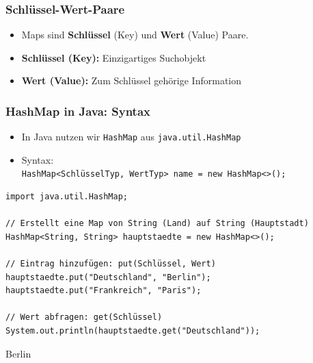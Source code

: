 \documentclass{../../presentation}
\begin{document}
\begin{frame}[fragile]
	\frametitle{Schlüssel-Wert-Paare}
	\begin{itemize}
		\item Maps sind \textbf{Schlüssel} (Key) und \textbf{Wert} (Value) Paare.
		\pause
		\item \textbf{Schlüssel (Key):} Einzigartiges Suchobjekt
		\pause
		\item \textbf{Wert (Value):} Zum Schlüssel gehörige Information
	\end{itemize}
	\pause
	\vspace{0.8em}
	\centering
\end{frame}

\begin{frame}[fragile]
	\frametitle{HashMap in Java: Syntax}
	\begin{itemize}
		\item In Java nutzen wir \texttt{HashMap} aus \texttt{java.util.HashMap}
		\item Syntax: \\\texttt{HashMap<SchlüsselTyp, WertTyp> name = new HashMap<>();}
	\end{itemize}
	\pause
	\begin{verbatim}
import java.util.HashMap;

// Erstellt eine Map von String (Land) auf String (Hauptstadt)
HashMap<String, String> hauptstaedte = new HashMap<>();

// Eintrag hinzufügen: put(Schlüssel, Wert)
hauptstaedte.put("Deutschland", "Berlin");
hauptstaedte.put("Frankreich", "Paris");

// Wert abfragen: get(Schlüssel)
System.out.println(hauptstaedte.get("Deutschland"));
	\end{verbatim}
	\pause
	\begin{ausgabe}
		Berlin
	\end{ausgabe}
\end{frame}
\end{document}
